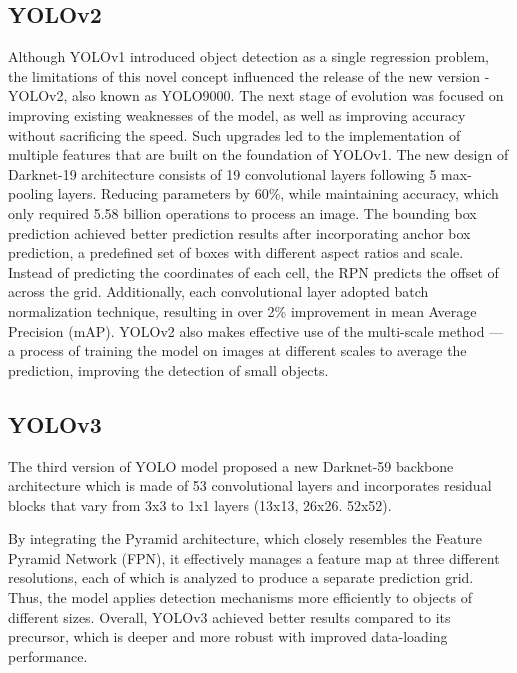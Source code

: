 \begin{multicols}{2}
\subsection{YOLOv2}
Although YOLOv1 introduced object detection as a single regression problem, the limitations of this novel concept influenced the release of the new version - YOLOv2, also known as YOLO9000. The next stage of evolution was focused on improving existing weaknesses of the model, as well as improving accuracy without sacrificing the speed. Such upgrades led to the implementation of multiple features that are built on the foundation of YOLOv1. The new design of Darknet-19 architecture consists of 19 convolutional layers following 5 max-pooling layers. Reducing parameters by 60\%, while maintaining accuracy, which only required 5.58 billion operations to process an image. The bounding box prediction achieved better prediction results after incorporating anchor box prediction, a predefined set of boxes with different aspect ratios and scale. Instead of predicting the coordinates of each cell, the RPN predicts the offset of across the grid. Additionally, each convolutional layer adopted batch normalization technique, resulting in over 2\% improvement in mean Average Precision (mAP). YOLOv2 also makes effective use of the multi-scale method — a process of training the model on images at different scales to average the prediction, improving the detection of small objects.



\subsection{YOLOv3}
The third version of YOLO model proposed a new Darknet-59 backbone architecture which is made of 53 convolutional layers and incorporates residual blocks that vary from 3x3 to 1x1 layers (13x13, 26x26. 52x52). 

By integrating the Pyramid architecture, which closely resembles the Feature Pyramid Network (FPN), it effectively manages a feature map at three different resolutions, each of which is analyzed to produce a separate prediction grid. Thus, the model applies detection mechanisms more efficiently to objects of different sizes. Overall, YOLOv3 achieved better results compared to its precursor, which is deeper and more robust with improved data-loading performance.


\end{multicols}
